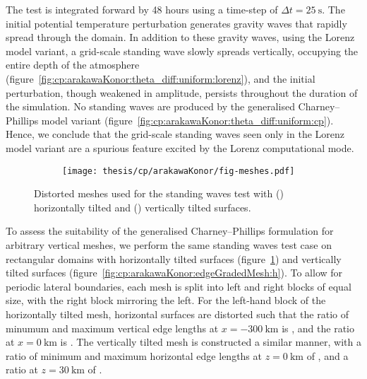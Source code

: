 The test is integrated forward by 48 hours using a time-step of $\Delta t = \SI{25}{\second}$.
The initial potential temperature perturbation generates gravity waves that rapidly spread through the domain.
In addition to these gravity waves, using the Lorenz model variant, a grid-scale standing wave slowly spreads vertically, occupying the entire depth of the atmosphere (figure~\ref{fig:cp:arakawaKonor:theta_diff:uniform:lorenz}), and the initial perturbation, though weakened in amplitude, persists throughout the duration of the simulation.
No standing waves are produced by the generalised Charney--Phillips model variant (figure~\ref{fig:cp:arakawaKonor:theta_diff:uniform:cp}).
Hence, we conclude that the grid-scale standing waves seen only in the Lorenz model variant are a spurious feature excited by the Lorenz computational mode.

\begin{figure}
	\centering
	\begin{subfigure}{\textwidth}
		\label{fig:cp:arakawaKonor:edgeGradedMesh:h}
		\label{fig:cp:arakawaKonor:edgeGradedMesh:v}
		\texttt{[image: thesis/cp/arakawaKonor/fig-meshes.pdf]}
	\end{subfigure}
%
	\caption{Distorted meshes used for the standing waves test with
	() horizontally tilted and
	() vertically tilted surfaces.}
	\label{fig:cp:arakawaKonor:edgeGradedMesh}
\end{figure}

To assess the suitability of the generalised Charney--Phillips formulation for arbitrary vertical meshes, we perform the same standing waves test case on rectangular domains with horizontally tilted surfaces (figure~\ref{fig:cp:arakawaKonor:edgeGradedMesh:v}) and vertically tilted surfaces (figure~\ref{fig:cp:arakawaKonor:edgeGradedMesh:h}).
To allow for periodic lateral boundaries, each mesh is split into left and right blocks of equal size, with the right block mirroring the left.
For the left-hand block of the horizontally tilted mesh, horizontal surfaces are distorted such that the ratio of minumum and maximum vertical edge lengths at $x = \SI{-300}{\kilo\meter}$ is , and the ratio at $x = \SI{0}{\kilo\meter}$ is .
The vertically tilted mesh is constructed a similar manner, with a ratio of minimum and maximum horizontal edge lengths at $z = \SI{0}{\kilo\meter}$ of , and a ratio at $z = \SI{30}{\kilo\meter}$ of .

